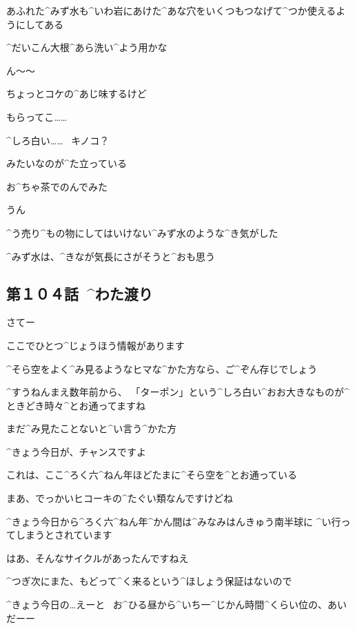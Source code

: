 \page[50]
\Alpha あふれた^{みず}{水}も^{いわ}{岩}にあけた^{あな}{穴}をいくつもつなげて^{つか}{使}えるようにしてある

\Alpha ^{だいこん}{大根}^{あら}{洗}い^{よう}{用}かな

\page[51]
\Alpha ん〜〜

\Alpha ちょっとコケの^{あじ}{味}するけど

\Alpha もらってこ……

\page[53]
\Alpha ^{しろ}{白}い……
\ キノコ？

\Alpha みたいなのが^{た}{立}っている

\page[55]
\Alpha お^{ちゃ}{茶}でのんでみた

\Alpha うん

\page[56]
\Alpha ^{う}{売}り^{もの}{物}にしてはいけない^{みず}{水}のような^{き}{気}がした

\Alpha ^{みず}{水}は、^{きなが}{気長}にさがそうと^{おも}{思}う


\subsection{第１０４話\ ^{わた}{渡}り}

\page[59]
\Person さてー

\Person ここでひとつ^{じょうほう}{情報}があります

\page[60]
\Person ^{そら}{空}をよく^{み}{見}るようなヒマな^{かた}{方}なら、ご^{ぞん}{存}じでしょう

\Person ^{すうねんまえ}{数年前}から、
「ターポン」という^{しろ}{白}い^{おお}{大}きなものが^{ときどき}{時々}^{とお}{通}ってますね

\Person まだ^{み}{見}たことないと^{い}{言}う^{かた}{方}

\Person ^{きょう}{今日}が、チャンスですよ

\Person これは、ここ^{ろく}{六}^{ねん}{年}ほどたまに^{そら}{空}を^{とお}{通}っている

\Person まあ、でっかいヒコーキの^{たぐい}{類}なんですけどね

\page[61]
\Person ^{きょう}{今日}から^{ろく}{六}^{ねん}{年}^{かん}{間}は^{みなみはんきゅう}{南半球}に
^{い}{行}ってしまうとされています

\Person はあ、そんなサイクルがあったんですねえ

\Person ^{つぎ}{次}にまた、もどって^{く}{来}るという^{ほしょう}{保証}はないので

\Person ^{きょう}{今日}の…えーと
\ お^{ひる}{昼}から^{いち}{一}^{じかん}{時間}^{くらい}{位}の、あいだーー

